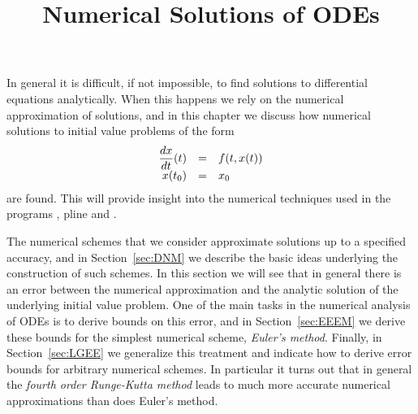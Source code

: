 \documentclass{ximera}
\title{Numerical Solutions of ODEs}
\begin{document}
\begin{abstract}
\end{abstract}
\maketitle


\label{ch:NumSolODE}

\normalsize

In general it is difficult, if not impossible, to find solutions to 
differential equations analytically.   When this happens we rely on the
numerical approximation of solutions, and in this chapter we discuss 
how numerical solutions to initial value 
problems of the form
\arraystart
\[
\begin{array}{rcl}
\displaystyle\frac{dx}{dt}(t) & = & f(t,x(t)) \\
x(t_0) & = & x_0
\end{array}
\]
\arrayfinish
are found.  This will provide insight into the numerical
techniques used in the \Matlab programs {\dfield},
{\sf pline} and {\pplane}.

The numerical schemes that we consider approximate 
solutions up to a specified accuracy, and
in Section~\ref{sec:DNM} we describe the basic ideas
underlying the construction of such schemes.  In this
section we will see that in general there is an error between 
the numerical approximation and the analytic solution
of the underlying initial value problem.  One of the main
tasks in the numerical analysis of ODEs is to derive bounds
on this error, and in Section~\ref{sec:EEEM} we derive these bounds
for the simplest numerical scheme, {\em Euler's method}.  Finally, 
in Section~\ref{sec:LGEE}
we generalize this treatment and indicate how to derive error 
bounds for arbitrary numerical schemes.  In particular it
turns out that in general the {\em fourth order Runge-Kutta method\/}
leads to much more accurate numerical approximations than 
does Euler's method.
\end{document}
